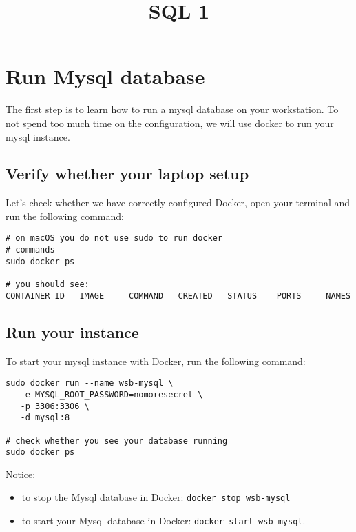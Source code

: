 \documentclass[12pt, letterpaper]{article}
\title{{\Huge \textbf{{SQL} 1}}}
\date{}
\begin{document}
\begin{titlepage}
\maketitle
\end{titlepage}

\tableofcontents
\pagebreak
\section{Run Mysql database}

The first step is to learn how to run a mysql database on your workstation. To not spend too much time on the configuration, we will use docker to run your mysql instance.

\subsection{Verify whether your laptop setup}

Let's check whether we have correctly configured Docker, open your terminal and run the following command:

\begin{verbatim}
# on macOS you do not use sudo to run docker
# commands
sudo docker ps

# you should see:
CONTAINER ID   IMAGE     COMMAND   CREATED   STATUS    PORTS     NAMES

\end{verbatim}

\subsection{Run your instance}
To start your mysql instance with Docker, run the following command:

\begin{verbatim}
sudo docker run --name wsb-mysql \
   -e MYSQL_ROOT_PASSWORD=nomoresecret \
   -p 3306:3306 \
   -d mysql:8

# check whether you see your database running
sudo docker ps
\end{verbatim}

Notice:
\begin{itemize}
\item to stop the Mysql database in Docker: \texttt{docker stop wsb-mysql}
\item to start your Mysql database in Docker: \texttt{docker start wsb-mysql}.
\end{itemize}
\end{document}
